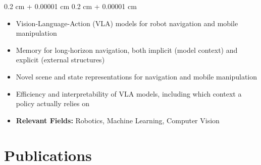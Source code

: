 \documentclass[10pt, letterpaper]{article}
\newenvironment{highlights}{
    \begin{itemize}[
        topsep=0.10 cm,
        parsep=0.10 cm,
        partopsep=0pt,
        itemsep=0pt,
        leftmargin=0.4 cm + 10pt
    ]
}{
    \end{itemize}
} %
\newenvironment{onecolentry}{
    \begin{adjustwidth}{
        0.2 cm + 0.00001 cm
    }{
        0.2 cm + 0.00001 cm
    }
}{
    \end{adjustwidth}
} %
\begin{document}
\begin{onecolentry}
    \begin{highlights}
        \item Vision-Language-Action (VLA) models for robot navigation and mobile manipulation
        \item Memory for long-horizon navigation, both implicit (model context) and explicit (external structures)
        \item Novel scene and state representations for navigation and mobile manipulation
        \item Efficiency and interpretability of VLA models, including which context a policy actually relies on
        \item \textbf{Relevant Fields:} Robotics, Machine Learning, Computer Vision
    \end{highlights}
\end{onecolentry}


    
    \section{Publications}
\end{document}
